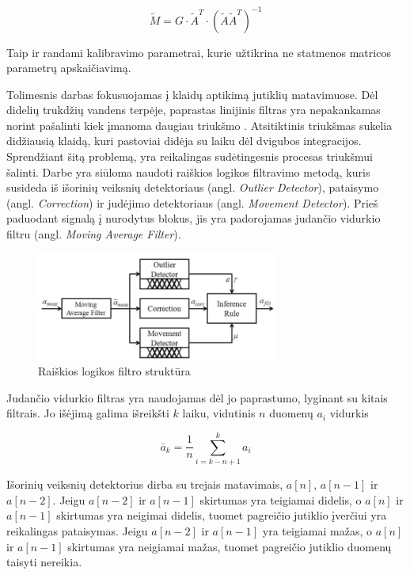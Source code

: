 \begin{equation}
    \tilde{M} = G \cdot \tilde{A}^T \cdot (\tilde{A}\tilde{A}^T)^{-1}
\end{equation}

Taip ir randami kalibravimo parametrai, kurie užtikrina ne statmenos matricos parametrų apskaičiavimą.

Tolimesnis darbas fokusuojamas į klaidų aptikimą jutiklių matavimuose. Dėl didelių trukdžių vandens terpėje, paprastas linijinis filtras yra nepakankamas norint pašalinti kiek įmanoma daugiau triukšmo \cite{gaysse2005using}. Atsitiktinis triukšmas sukelia didžiausią klaidą, kuri pastoviai didėja su laiku dėl dvigubos integracijos. Sprendžiant šitą problemą, yra reikalingas sudėtingesnis procesas triukšmui šalinti. Darbe yra siūloma naudoti raiškios logikos filtravimo metodą, kuris susideda iš išorinių veiksnių detektoriaus (angl. \textit{Outlier Detector}), pataisymo (angl. \textit{Correction}) ir judėjimo detektoriaus (angl. \textit{Movement Detector}). Prieš paduodant signalą į nurodytus blokus, jis yra padorojamas judančio vidurkio filtru (angl. \textit{Moving Average Filter}).

\begin{figure}[H]
    \centering
    \includegraphics[width=300px]{img/fuzzy_filter_structure.png}
    \caption{Raiškios logikos filtro struktūra \cite{yoo2011fuzzy}}
    \label{fig:fuzzy_filter_structure}
\end{figure}

Judančio vidurkio filtras yra naudojamas dėl jo paprastumo, lyginant su kitais filtrais. Jo išėjimą galima išreikšti $k$ laiku, vidutinis $n$ duomenų $a_i$ vidurkis

\begin{equation}
    \bar{a}_k = \frac{1}{n} \sum_{i=k-n+1}^{k} a_i
\end{equation}

Išorinių veiksnių detektorius dirba su trejais matavimais, $a[n]$, $a[n-1]$ ir $a[n-2]$. Jeigu $a[n-2]$ ir $a[n-1]$ skirtumas yra teigiamai didelis, o $a[n]$ ir $a[n-1]$ skirtumas yra neigimai didelis, tuomet pagreičio jutiklio įverčiui yra reikalingas pataisymas. Jeigu $a[n-2]$ ir $a[n-1]$ yra teigiamai mažas, o $a[n]$ ir $a[n-1]$ skirtumas yra neigiamai mažas, tuomet pagreičio jutiklio duomenų taisyti nereikia.

